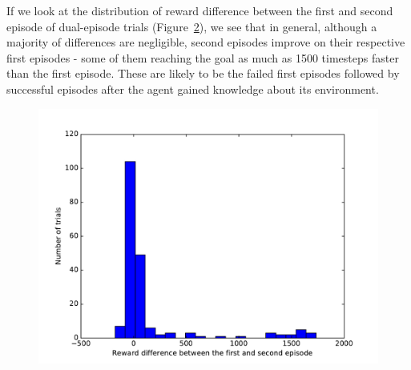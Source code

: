 \documentclass[letterpaper]{article}
\begin{document}
If we look at the distribution of reward difference between the first
and second episode of dual-episode trials (Figure~\ref{fig:reward_diff}), we 
see that in general, although a majority of differences are negligible,
second episodes improve on their respective first episodes - some of them
reaching the goal as much as 1500 timesteps faster than the first episode. These
are likely to be the failed first episodes followed by successful episodes
after the agent gained knowledge about its environment.


\begin{figure}
	\centering
	\caption{}
	\label{fig:distrib}
\end{figure}
\begin{figure}[h]
	\centering
	\includegraphics[width=\linewidth]{fig/reward_diff.pdf}
	\caption{}
	\label{fig:reward_diff}
\end{figure}
\end{document}
